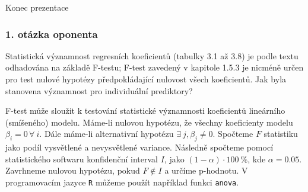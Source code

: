 \documentclass[
	11pt, %
]{beamer}
\begin{document}

\begin{frame}[plain] %
	\begin{center}
		{\Huge Konec prezentace}
	\end{center}
\end{frame}


\begin{frame}[plain] %
	\frametitle{1. otázka oponenta}

Statistická významnost regresních koeficientů (tabulky 3.1 až 3.8) je podle textu odhadována na základě F-testu; F-test zavedený v kapitole 1.5.3 je nicméně určen pro test nulové hypotézy předpokládající nulovost všech koeficientů. Jak byla stanovena významnost pro individuální prediktory?


\end{frame}

\begin{frame}
F-test může sloužit k testování statistické významnosti koeficientů lineárního (smíšeného) modelu. Máme-li nulovou hypotézu, že všechny koeficienty modelu $\beta_i = 0\, \forall\ i$. Dále máme-li alternativní hypotézu $\exists\ j, \beta_j\neq 0$. Spočteme $F$ statistiku jako podíl vysvětlené a nevysvětlené variance. Následně spočteme pomocí statistického softwaru konfidenční interval $I$, jako $(1-\alpha)\cdot\SI{100}{\%}$, kde $\alpha = 0.05$. Zavrhneme nulovou hypotézu, pokud $F\notin I$ a určíme p-hodnotu. V programovacím jazyce \texttt{R} můžeme použít například funkci \texttt{anova}.
\end{frame}
\end{document}

